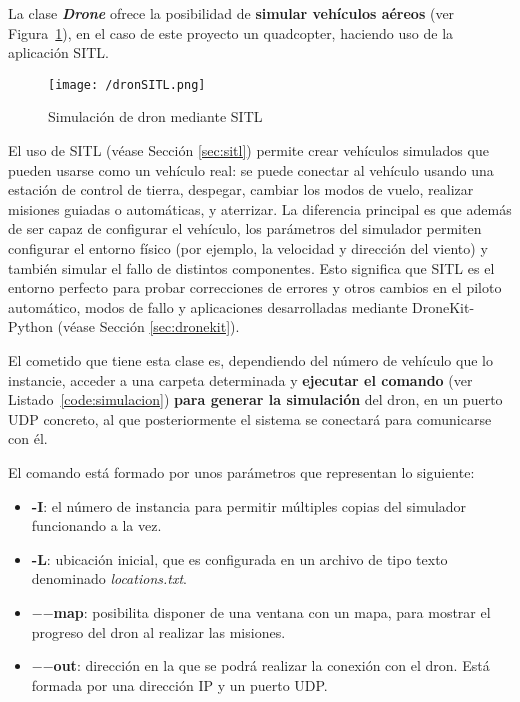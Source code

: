 La clase \textbf{\textit{Drone}} ofrece la posibilidad de \textbf{simular vehículos aéreos} (ver Figura~\ref{fig:dronSITL}), en el caso de este proyecto un quadcopter, haciendo uso de la aplicación \acs{SITL}.

\begin{figure}[!h]
\begin{center}
\texttt{[image: /dronSITL.png]}
\caption[Simulación de dron mediante \acs{SITL}]{Simulación de dron mediante \acs{SITL}}
\label{fig:dronSITL}
\end{center}
\end{figure}

El uso de \acs{SITL} (véase Sección \ref{sec:sitl}) permite crear vehículos simulados que pueden usarse como un vehículo real: se puede conectar al vehículo usando una estación de control de tierra, despegar, cambiar los modos de vuelo, realizar misiones guiadas o automáticas, y aterrizar. La diferencia principal es que además de ser capaz de configurar el vehículo, los parámetros del simulador permiten configurar el entorno físico (por ejemplo, la velocidad y dirección del viento) y también simular el fallo de distintos componentes. Esto significa que \acs{SITL} es el entorno perfecto para probar correcciones de errores y otros cambios en el piloto automático, modos de fallo y aplicaciones desarrolladas mediante DroneKit-Python (véase Sección \ref{sec:dronekit}).

\clearpage

El cometido que tiene esta clase es, dependiendo del número de vehículo que lo instancie, acceder a una carpeta determinada y \textbf{ejecutar el comando} (ver Listado~\ref{code:simulacion}) \textbf{para generar la simulación} del dron, en un puerto UDP concreto, al que posteriormente el sistema se conectará para comunicarse con él.


El comando está formado por unos parámetros que representan lo siguiente:
\begin{itemize}
\item \textbf{-I}: el número de instancia para permitir múltiples copias del simulador funcionando a la vez.
\item \textbf{-L}: ubicación inicial, que es configurada en un archivo de tipo texto denominado \textit{locations.txt}.
\item \textbf{$-$$-$map}: posibilita disponer de una ventana con un mapa, para mostrar el progreso del dron al realizar las misiones.
\item \textbf{$-$$-$out}: dirección en la que se podrá realizar la conexión con el dron. Está formada por una dirección IP y un puerto UDP.
\end{itemize}

